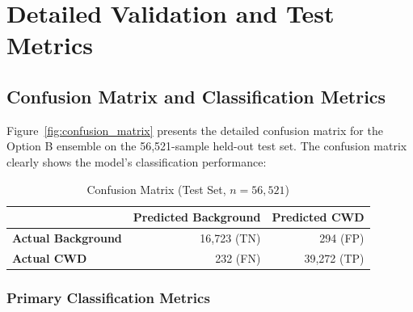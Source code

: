 \section{Detailed Validation and Test Metrics}

\subsection{Confusion Matrix and Classification Metrics}

Figure~\ref{fig:confusion_matrix} presents the detailed confusion matrix for the Option B ensemble
on the 56,521-sample held-out test set. The confusion matrix clearly shows the model's classification
performance:

\begin{table}[h!]
\centering
\caption{Confusion Matrix (Test Set, $n=56,521$)}
\label{tab:confusion_matrix}
\begin{tabular}{lrr}
\hline
 & \textbf{Predicted Background} & \textbf{Predicted CWD} \\
\hline
\textbf{Actual Background} & 16,723 (TN) & 294 (FP) \\
\textbf{Actual CWD} & 232 (FN) & 39,272 (TP) \\
\hline
\end{tabular}
\end{table}

\subsubsection{Primary Classification Metrics}


